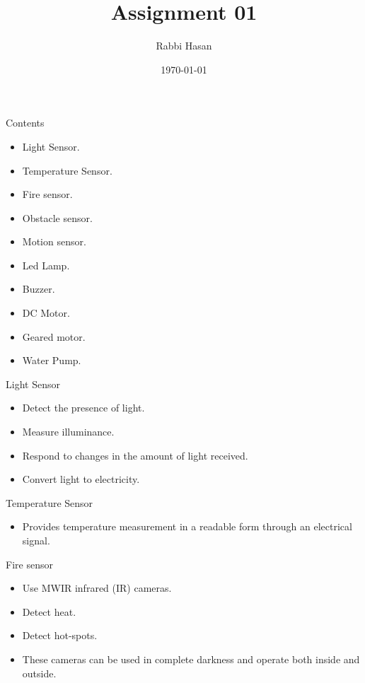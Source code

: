 \documentclass[10pt]{beamer}
\begin{document}
\title{Assignment 01}
\author{Rabbi Hasan}
 
\date{\today}

\begin{frame}
\titlepage
\end{frame}

\begin{frame}{Contents}
\begin{itemize}
\item Light Sensor.
\item Temperature Sensor.
\item Fire sensor.
\item Obstacle sensor.
\item Motion sensor.
\item Led Lamp.
\item Buzzer.
\item DC Motor.
\item Geared motor.
\item Water Pump.
\end{itemize}
\end{frame}
\begin{frame}{Light Sensor}
\begin{itemize}

\item Detect the presence of light.
\item Measure illuminance.
\item Respond to changes in the
amount of light received.
\item Convert light to electricity.
\end{itemize}
\end{frame}
\begin{frame}{Temperature Sensor}
    \begin{itemize}
        \item Provides temperature
measurement in a readable
form through an electrical
signal.
    \end{itemize}
\end{frame}
\begin{frame}{Fire sensor}
\begin{itemize}
    \item Use MWIR infrared (IR) cameras.
\item Detect heat.
\item Detect hot-spots.
\item These cameras can be used in
complete darkness and operate
both inside and outside.
\end{itemize}
    
\end{frame}
\end{document}
